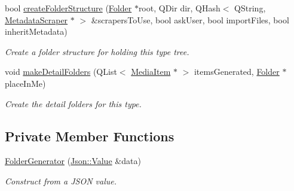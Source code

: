 \begin{DoxyCompactItemize}
bool \hyperlink{class_a_w_e_1_1_folder_generator_a00572426608615b236d112f4608c115f}{create\-Folder\-Structure} (\hyperlink{class_a_w_e_1_1_folder}{Folder} $\ast$root, Q\-Dir dir, Q\-Hash$<$ Q\-String, \hyperlink{class_a_w_e_1_1_metadata_scraper}{Metadata\-Scraper} $\ast$ $>$ \&scrapers\-To\-Use, bool ask\-User, bool import\-Files, bool inherit\-Metadata)
\begin{DoxyCompactList}\small\item\em Create a folder structure for holding this type tree. \end{DoxyCompactList}\item 
void \hyperlink{class_a_w_e_1_1_folder_generator_a455eacdb741bb0954877a2df8235815e}{make\-Detail\-Folders} (Q\-List$<$ \hyperlink{class_a_w_e_1_1_media_item}{Media\-Item} $\ast$ $>$ items\-Generated, \hyperlink{class_a_w_e_1_1_folder}{Folder} $\ast$place\-In\-Me)
\begin{DoxyCompactList}\small\item\em Create the detail folders for this type. \end{DoxyCompactList}\end{DoxyCompactItemize}
\subsection*{Private Member Functions}
\begin{DoxyCompactItemize}
\item 
\hyperlink{class_a_w_e_1_1_folder_generator_a0757c2cc2a2bb23f989159a86d87b2ae}{Folder\-Generator} (\hyperlink{class_json_1_1_value}{Json\-::\-Value} \&data)
\begin{DoxyCompactList}\small\item\em Construct from a J\-S\-O\-N value. \end{DoxyCompactList}\end{DoxyCompactItemize}
